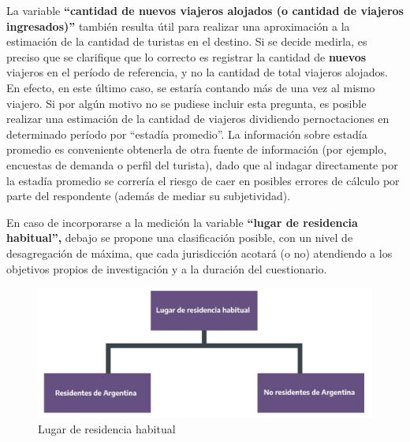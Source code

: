 \documentclass[
]{book}
\begin{document}
La variable \textbf{``cantidad de nuevos viajeros alojados (o cantidad de viajeros ingresados)''} también resulta útil para realizar una aproximación a la estimación de la cantidad de turistas en el destino. Si se decide medirla, es preciso que se clarifique que lo correcto es registrar la cantidad de \textbf{nuevos} viajeros en el período de referencia, y no la cantidad de total viajeros alojados. En efecto, en este último caso, se estaría contando más de una vez al mismo viajero. Si por algún motivo no se pudiese incluir esta pregunta, es posible realizar una estimación de la cantidad de viajeros dividiendo pernoctaciones en determinado período por ``estadía promedio''. La información sobre estadía promedio es conveniente obtenerla de otra fuente de información (por ejemplo, encuestas de demanda o perfil del turista), dado que al indagar directamente por la estadía promedio se correría el riesgo de caer en posibles errores de cálculo por parte del respondente (además de mediar su subjetividad).

En caso de incorporarse a la medición la variable \textbf{``lugar de residencia habitual'',} debajo se propone una clasificación posible, con un nivel de desagregación de máxima, que cada jurisdicción acotará (o no) atendiendo a los objetivos propios de investigación y a la duración del cuestionario.

\begin{figure}

{\centering \includegraphics[width=1\linewidth]{imagenes/figura_2} 

}

\caption{Lugar de residencia habitual}\label{fig:residencia-habitual}
\end{figure}
\end{document}
